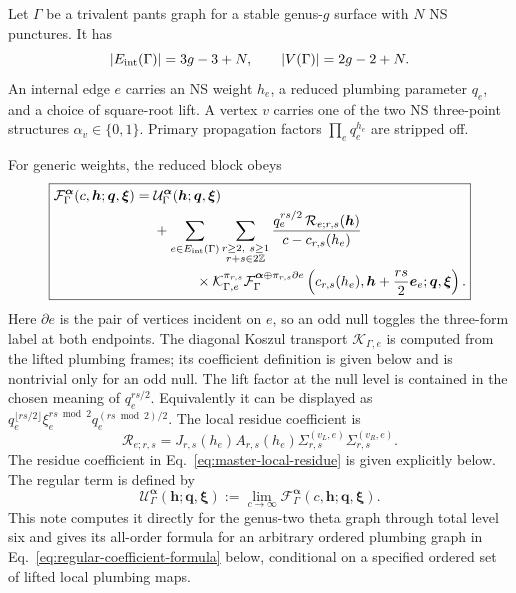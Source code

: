 \documentclass[11pt]{article}
\newcommand{\F}{\mathcal F}
\newcommand{\U}{\mathcal U}
\newcommand{\Rcal}{\mathcal R}
\newcommand{\ve}{\bm e}
\begin{document}
Let \(\Gamma\) be a trivalent pants graph for a stable genus-\(g\) surface
with \(N\) NS punctures.  It has
\begin{equation}
 |E_{\rm int}(\Gamma)|=3g-3+N,
 \qquad
 |V(\Gamma)|=2g-2+N.
 \label{eq:graph-counts}
\end{equation}
An internal edge \(e\) carries an NS weight \(h_e\), a reduced plumbing
parameter \(q_e\), and a choice of square-root lift.  A vertex \(v\) carries
one of the two NS three-point structures
\(\alpha_v\in\{0,1\}\).  Primary propagation factors
\(\prod_e q_e^{h_e}\) are stripped off.

For generic weights, the reduced block obeys
\begin{equation}
\boxed{
\begin{aligned}
 \F_{\Gamma}^{\bm\alpha}
 (c,\bm h;\bm q,\bm\xi)
={}&
 \U_{\Gamma}^{\bm\alpha}
 (\bm h;\bm q,\bm\xi)
 \\
 &+\sum_{e\in E_{\rm int}(\Gamma)}
 \sum_{\substack{r\ge2,\ s\ge1\\r+s\in2\mathbb Z}}
 \frac{q_e^{rs/2}\,
       \Rcal_{e;r,s}(\bm h)}
      {c-c_{r,s}(h_e)}
 \\
 &\hspace{3.0em}\times
 \mathcal K_{\Gamma,e}^{\pi_{r,s}}
 \F_{\Gamma}^{\bm\alpha\oplus
       \pi_{r,s}\partial e}
 \left(c_{r,s}(h_e),
       \bm h+\frac{rs}{2}\ve_e;
       \bm q,\bm\xi\right).
\end{aligned}}
\label{eq:master-result}
\end{equation}
Here \(\partial e\) is the pair of vertices incident on \(e\), so an odd
null toggles the three-form label at both endpoints.  The diagonal Koszul
transport \(\mathcal K_{\Gamma,e}\) is computed from the lifted plumbing
frames; its coefficient definition is given below and is nontrivial only for
an odd null.  The lift factor at the null level is contained in the chosen meaning of
\(q_e^{rs/2}\).  Equivalently it can be displayed as
\(q_e^{\lfloor rs/2\rfloor}\xi_e^{rs\bmod2}q_e^{(rs\bmod2)/2}\).
The local residue coefficient is
\begin{equation}
 \Rcal_{e;r,s}
 =J_{r,s}(h_e)A_{r,s}(h_e)
  \Sigma_{r,s}^{(v_L,e)}
  \Sigma_{r,s}^{(v_R,e)}.
 \label{eq:master-local-residue}
\end{equation}
The residue coefficient in Eq.~\eqref{eq:master-local-residue} is given
explicitly below.  The regular term is defined by
\begin{equation}
 \U_\Gamma^{\bm\alpha}(\bm h;\bm q,\bm\xi)
 :=\lim_{c\to\infty}
 \F_\Gamma^{\bm\alpha}(c,\bm h;\bm q,\bm\xi).
 \label{eq:regular-term-definition}
\end{equation}
This note computes it directly for the genus-two theta graph through total
level six and gives its all-order formula for an arbitrary ordered plumbing
graph in Eq.~\eqref{eq:regular-coefficient-formula} below, conditional on a
specified ordered set of lifted local plumbing maps.
\end{document}
